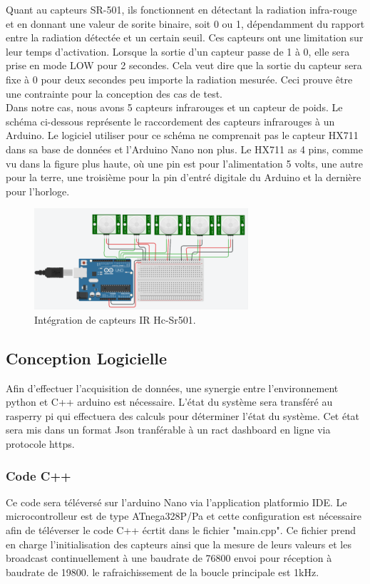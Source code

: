 \documentclass[journal]{IEEEtran}
\begin{document}
Quant au capteurs SR-501, ils fonctionnent en détectant la radiation infra-rouge et en donnant une valeur de sorite binaire, soit 0 ou 1, dépendamment du rapport entre la radiation détectée et un certain seuil. Ces capteurs ont une limitation sur leur temps d’activation. 
Lorsque la sortie d’un capteur passe de 1 à 0, elle sera prise en mode LOW pour 2 secondes. 
Cela veut dire que la sortie du capteur sera fixe à 0 pour deux secondes peu importe la radiation mesurée. Ceci prouve être une contrainte pour la conception des cas de test.\\

Dans notre cas, nous avons 5 capteurs infrarouges et un capteur de poids. 
Le schéma ci-dessous représente le raccordement des capteurs infrarouges à un Arduino. 
Le logiciel utiliser pour ce schéma ne comprenait pas le capteur HX711 dans sa base de données et l’Arduino Nano non plus. Le HX711 as 4 pins, comme vu dans la figure plus haute, où une pin est pour l’alimentation 5 volts, une autre pour la terre, une troisième pour la pin d’entré digitale du Arduino et la dernière pour l’horloge. 
\cite{b4}

\begin{figure}[htbp]
    \centerline{\includegraphics{hardware2.png}}
    \caption{Intégration de capteurs IR Hc-Sr501.\cite{b5}}
    \label{fig2}
\end{figure} 


\subsection{Conception Logicielle}
Afin d'effectuer l'acquisition de données, une synergie entre l'environnement python et C++ arduino est nécessaire. L'état du système sera transféré au rasperry pi qui effectuera
des calculs pour déterminer l'état du système. Cet état sera mis dans un format Json tranférable à un ract dashboard en ligne via protocole https. 

\subsubsection{Code C++}
Ce code sera téléversé sur l'arduino Nano  via l'application platformio IDE. Le microcontrolleur est de type ATnega328P/Pa et cette configuration est nécessaire afin de 
téléverser le code C++ écrtit dans le fichier "main.cpp". Ce fichier prend en charge l'initialisation des capteurs ainsi que la mesure de leurs valeurs et les broadcast continuellement
à une baudrate de  76800 envoi pour réception à baudrate de 19800. le rafraichissement de la boucle principale est 1kHz. 
\end{document}
